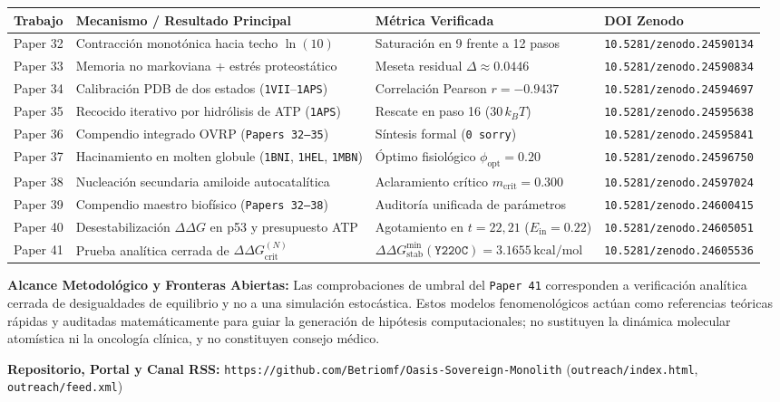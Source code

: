 \documentclass[11pt,a4paper]{article}
\begin{document}
\vspace{6pt}
\begin{center}
\small
\begin{tabular}{llll}
\toprule
\textbf{Trabajo} & \textbf{Mecanismo / Resultado Principal} & \textbf{M\'etrica Verificada} & \textbf{DOI Zenodo} \\
\midrule
Paper 32 & Contracci\'on monot\'onica hacia techo $\ln(10)$ & Saturaci\'on en 9 frente a 12 pasos & \texttt{10.5281/zenodo.24590134} \\
Paper 33 & Memoria no markoviana + estr\'es proteost\'atico & Meseta residual $\Delta \approx 0.0446$ & \texttt{10.5281/zenodo.24590834} \\
Paper 34 & Calibraci\'on PDB de dos estados (\texttt{1VII}--\texttt{1APS}) & Correlaci\'on Pearson $r = -0.9437$ & \texttt{10.5281/zenodo.24594697} \\
Paper 35 & Recocido iterativo por hidr\'olisis de ATP (\texttt{1APS}) & Rescate en paso 16 ($30\,k_B T$) & \texttt{10.5281/zenodo.24595638} \\
Paper 36 & Compendio integrado OVRP (\texttt{Papers 32--35}) & S\'intesis formal (\texttt{0 sorry}) & \texttt{10.5281/zenodo.24595841} \\
Paper 37 & Hacinamiento en molten globule (\texttt{1BNI}, \texttt{1HEL}, \texttt{1MBN}) & \'Optimo fisiol\'ogico $\phi_{\mathrm{opt}} = 0.20$ & \texttt{10.5281/zenodo.24596750} \\
Paper 38 & Nucleaci\'on secundaria amiloide autocatal\'itica & Aclaramiento cr\'itico $m_{\mathrm{crit}} = 0.300$ & \texttt{10.5281/zenodo.24597024} \\
Paper 39 & Compendio maestro biof\'isico (\texttt{Papers 32--38}) & Auditor\'ia unificada de par\'ametros & \texttt{10.5281/zenodo.24600415} \\
Paper 40 & Desestabilizaci\'on $\Delta\Delta G$ en p53 y presupuesto ATP & Agotamiento en $t=22, 21$ ($E_{\mathrm{in}}=0.22$) & \texttt{10.5281/zenodo.24605051} \\
Paper 41 & Prueba anal\'itica cerrada de $\Delta\Delta G_{\mathrm{crit}}^{(N)}$ & $\Delta\Delta G_{\mathrm{stab}}^{\min}(\texttt{Y220C}) = 3.1655\,\mathrm{kcal/mol}$ & \texttt{10.5281/zenodo.24605536} \\
\bottomrule
\end{tabular}
\end{center}

\vspace{6pt}
\noindent\textbf{Alcance Metodol\'ogico y Fronteras Abiertas:}
Las comprobaciones de umbral del \texttt{Paper 41} corresponden a verificaci\'on anal\'itica cerrada de desigualdades de equilibrio y no a una simulaci\'on estoc\'astica. Estos modelos fenomenol\'ogicos act\'uan como referencias te\'oricas r\'apidas y auditadas matem\'aticamente para guiar la generaci\'on de hip\'otesis computacionales; no sustituyen la din\'amica molecular atom\'istica ni la oncolog\'ia cl\'inica, y no constituyen consejo m\'edico.

\vspace{4pt}
\noindent\textbf{Repositorio, Portal y Canal RSS:} \texttt{https://github.com/Betriomf/Oasis-Sovereign-Monolith} (\texttt{outreach/index.html}, \texttt{outreach/feed.xml})
\end{document}

